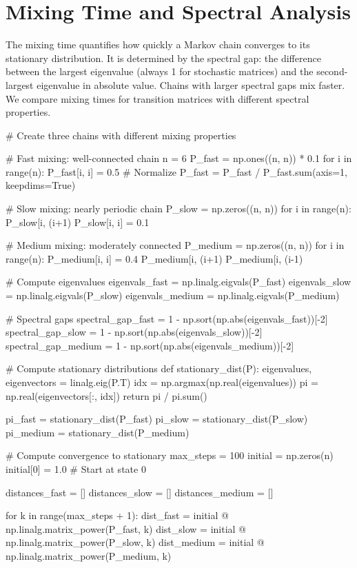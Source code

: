 \documentclass[11pt,a4paper]{article}
\begin{document}
\section{Mixing Time and Spectral Analysis}

The mixing time quantifies how quickly a Markov chain converges to its stationary distribution. It is determined by the spectral gap: the difference between the largest eigenvalue (always 1 for stochastic matrices) and the second-largest eigenvalue in absolute value. Chains with larger spectral gaps mix faster. We compare mixing times for transition matrices with different spectral properties.

\begin{pycode}
# Create three chains with different mixing properties

# Fast mixing: well-connected chain
n = 6
P_fast = np.ones((n, n)) * 0.1
for i in range(n):
    P_fast[i, i] = 0.5
# Normalize
P_fast = P_fast / P_fast.sum(axis=1, keepdims=True)

# Slow mixing: nearly periodic chain
P_slow = np.zeros((n, n))
for i in range(n):
    P_slow[i, (i+1) %
    P_slow[i, i] = 0.1

# Medium mixing: moderately connected
P_medium = np.zeros((n, n))
for i in range(n):
    P_medium[i, i] = 0.4
    P_medium[i, (i+1) %
    P_medium[i, (i-1) %

# Compute eigenvalues
eigenvals_fast = np.linalg.eigvals(P_fast)
eigenvals_slow = np.linalg.eigvals(P_slow)
eigenvals_medium = np.linalg.eigvals(P_medium)

# Spectral gaps
spectral_gap_fast = 1 - np.sort(np.abs(eigenvals_fast))[-2]
spectral_gap_slow = 1 - np.sort(np.abs(eigenvals_slow))[-2]
spectral_gap_medium = 1 - np.sort(np.abs(eigenvals_medium))[-2]

# Compute stationary distributions
def stationary_dist(P):
    eigenvalues, eigenvectors = linalg.eig(P.T)
    idx = np.argmax(np.real(eigenvalues))
    pi = np.real(eigenvectors[:, idx])
    return pi / pi.sum()

pi_fast = stationary_dist(P_fast)
pi_slow = stationary_dist(P_slow)
pi_medium = stationary_dist(P_medium)

# Compute convergence to stationary
max_steps = 100
initial = np.zeros(n)
initial[0] = 1.0  # Start at state 0

distances_fast = []
distances_slow = []
distances_medium = []

for k in range(max_steps + 1):
    dist_fast = initial @ np.linalg.matrix_power(P_fast, k)
    dist_slow = initial @ np.linalg.matrix_power(P_slow, k)
    dist_medium = initial @ np.linalg.matrix_power(P_medium, k)


\end{pycode}
\end{document}
